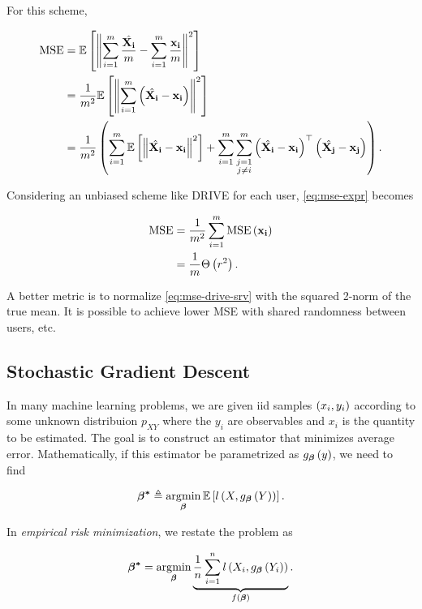 \documentclass[twoside]{article}
\begin{document}
For this scheme,

\begin{align}
    \mathrm{MSE} &= \mathbb{E}\left[ \left\lVert\sum_{i=1}^m\frac{\hat{\boldsymbol{\mathbf{X_i}}}}{m} - \sum_{i=1}^m\frac{\boldsymbol{\mathbf{x_i}}}{m}\right\rVert^2 \right] \\
                 &= \frac{1}{m^2}\mathbb{E}\left[ \left\lVert\sum_{i=1}^m\left(\hat{\boldsymbol{\mathbf{X_i}}}-\boldsymbol{\mathbf{x_i}}\right)\right\rVert^2 \right] \\
                 &= \frac{1}{m^2}\left(\sum_{i=1}^m\mathbb{E}\left[ \left\lVert\hat{\boldsymbol{\mathbf{X_i}}}-\boldsymbol{\mathbf{x_i}}\right\rVert^2 \right]+\sum_{i=1}^m\sum_{\substack{j=1\\j\neq i}}^m\left(\hat{\boldsymbol{\mathbf{X_i}}}-\boldsymbol{\mathbf{x_i}}\right)^\top\left(\hat{\boldsymbol{\mathbf{X_j}}}-\boldsymbol{\mathbf{x_j}}\right)\right).
                 \label{eq:mse-expr}
\end{align}

Considering an unbiased scheme like DRIVE for each user, \eqref{eq:mse-expr}
becomes

\begin{align}
    \mathrm{MSE} &= \frac{1}{m^2}\sum_{i=1}^m\mathrm{MSE}\left(\boldsymbol{\mathbf{x_i}}\right) \\
                 &= \frac{1}{m}\Theta\left(r^2\right).
                 \label{eq:mse-drive-srv}
\end{align}

A better metric is to normalize \eqref{eq:mse-drive-srv} with the squared 2-norm
of the true mean. It is possible to achieve lower MSE with shared randomness
between users, etc.

\subsection{Stochastic Gradient Descent}

In many machine learning problems, we are given iid samples \(\left(x_i,y_i\right)\)
according to some unknown distribuion \(p_{XY}\) where the \(y_i\) are
observables and \(x_i\) is the quantity to be estimated. The goal is to
construct an estimator that minimizes average error. Mathematically, if this
estimator be parametrized as \(g_{\boldsymbol{\mathbf{\beta}}}\left(y\right)\), we need to find

\begin{equation}
    \boldsymbol{\mathbf{\beta^*}} \triangleq \operatorname*{arg\!\min}_{\boldsymbol{\mathbf{\beta}}}\mathbb{E}\left[ l\left(X,g_{\boldsymbol{\mathbf{\beta}}}\left(Y\right)\right) \right].
    \label{eq:beta-star-def}
\end{equation}

In \emph{empirical risk minimization}, we restate the problem as

\begin{equation}
    \boldsymbol{\mathbf{\beta^*}} = \operatorname*{arg\!\min}_{\boldsymbol{\mathbf{\beta}}}\underbrace{\frac{1}{n}\sum_{i=1}^n l\left(X_i, g_{\boldsymbol{\mathbf{\beta}}}\left(Y_i\right)\right)}_{f\left(\boldsymbol{\mathbf{\beta}}\right)}.
    \label{eq:emp-risk-min}
\end{equation}
\end{document}
